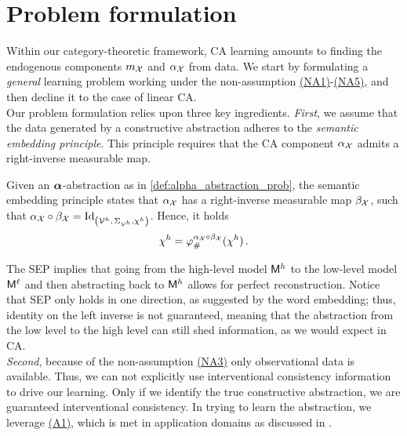 \section{Problem formulation}\label{sec:problem_formulation}
Within our category-theoretic framework, CA learning amounts to finding the endogenous components $m_\mathcal{X}$ and $\alpha_{\mathcal{X}}$ from data.
We start by formulating a \emph{general} learning problem working under the non-assumption \hyperlink{(NA1)}{(NA1)}-\hyperlink{(NA5)}{(NA5)}, and then decline it to the case of linear CA.\\
Our problem formulation relies upon three key ingredients.
\textit{First}, we assume that the data generated by a constructive abstraction adheres to the \emph{semantic embedding principle}. This principle requires that the CA component $\alpha_{\mathcal{X}}$ admits a right-inverse measurable map. 
\begin{definition}\label{def:semantic_embedding_principle}
    Given an $\boldsymbol{\alpha}$-abstraction as in \cref{def:alpha_abstraction_prob}, the semantic embedding principle states that $\alpha_{\mathcal{X}}$ has a right-inverse measurable map $\beta_{\mathcal{X}}$, such that $\alpha_{\mathcal{X}} \circ \beta_{\mathcal{X}} = \mathrm{Id}_{\left(\mathcal{V}^{h},\, \Sigma_{\mathcal{V}^h}, \chi^{h}\right)}$.
    Hence, it holds 
    \begin{equation}\label{eq:semantic_embedding}
        \chi^{h}=\varphi^{\alpha_{\mathcal{X}} \circ \beta_{\mathcal{X}}}_{\#}(\chi^{h})\,.
    \end{equation}
\end{definition}
The SEP implies that going from the high-level model $\mathsf{M}^{h}$ to the low-level model $\mathsf{M}^{\ell}$ and then abstracting back to $\mathsf{M}^{h}$ allows for perfect reconstruction. 
Notice that SEP only holds in one direction, as suggested by the word embedding; thus, identity on the left inverse is not guaranteed, meaning that the abstraction from the low level to the high level can still shed information, as we would expect in CA.\\
\textit{Second}, because of the non-assumption \hyperlink{(NA3)}{(NA3)} only observational data is available. 
Thus, we can not explicitly use interventional consistency information to drive our learning. 
Only if we identify the true constructive abstraction, we are guaranteed interventional consistency. 
In trying to learn the abstraction, we leverage \hyperlink{(A1)}{(A1)}, which is met in application domains as discussed in .\\
